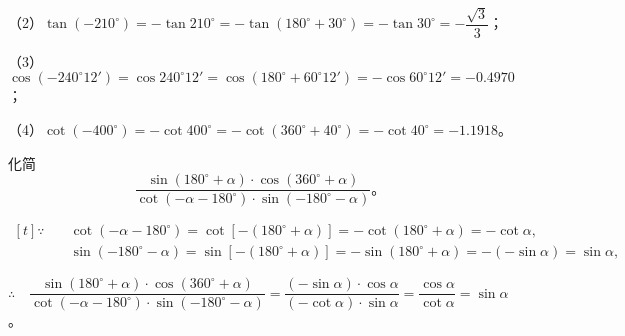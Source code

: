 （2）$\tan(-210^\circ) = -\tan 210^\circ = -\tan(180^\circ + 30^\circ) = -\tan 30^\circ = -\dfrac{\sqrt{3}}{3}$；
\vspace{0.5em}

（3）$\cos(-240^\circ 12') = \cos 240^\circ 12' = \cos(180^\circ + 60^\circ 12') = -\cos 60^\circ 12' = -0.4970$；

（4）$\cot(-400^\circ) = -\cot 400^\circ = -\cot(360^\circ + 40^\circ) = -\cot 40^\circ = -1.1918$。

\liti 化简
$$\dfrac{\sin(180^\circ + \alpha) \cdot \cos(360^\circ + \alpha)}{\cot(-\alpha - 180^\circ) \cdot \sin(-180^\circ - \alpha)} \text{。}$$

\jie $\begin{aligned}[t]
    \because \quad &\cot(-\alpha - 180^\circ) = \cot[-(180^\circ + \alpha)] = -\cot(180^\circ + \alpha) = -\cot\alpha , \\
    &\sin(-180^\circ - \alpha) = \sin[-(180^\circ + \alpha)] = -\sin(180^\circ + \alpha) = -(-\sin\alpha) = \sin\alpha ,
\end{aligned}$

\vspace{0.5em}
$\therefore \quad \dfrac{\sin(180^\circ + \alpha) \cdot \cos(360^\circ + \alpha)}{\cot(-\alpha - 180^\circ) \cdot \sin(-180^\circ - \alpha)}
= \dfrac{(-\sin\alpha) \cdot \cos\alpha}{(-\cot\alpha) \cdot \sin\alpha} = \dfrac{\cos\alpha}{\cot\alpha} = \sin\alpha
$。
\vspace{0.5em}

